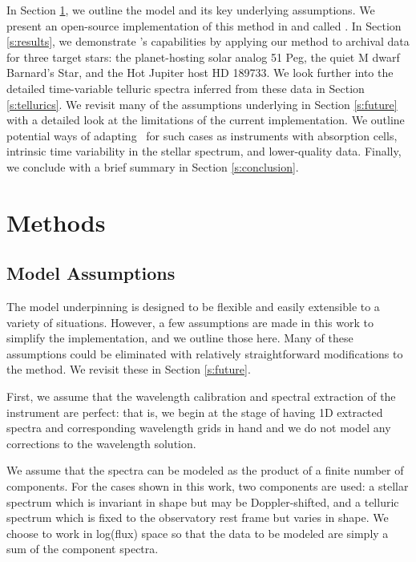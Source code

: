\documentclass[modern]{aastex62}
\newcommand{\Mdwarf}{Barnard's Star\xspace} %
\begin{document}
In Section \ref{s:methods}, we outline the model and its key underlying assumptions.
We present an open-source implementation of this method in \python and \TF called \wobble.
In Section \ref{s:results}, we demonstrate \wobble's capabilities by applying our method to \HARPS archival data for three target stars: the planet-hosting solar analog 51 Peg, the quiet M dwarf \Mdwarf, and the Hot Jupiter host HD 189733.
We look further into the detailed time-variable telluric spectra inferred from these data in Section \ref{s:tellurics}.
We revisit many of the assumptions underlying \wobble in Section \ref{s:future} with a detailed look at the limitations of the current implementation.
We outline potential ways of adapting \wobble\ for such cases as instruments with absorption cells, intrinsic time variability in the stellar spectrum, and lower-quality data.
Finally, we conclude with a brief summary in Section \ref{s:conclusion}.

\section{Methods}
\label{s:methods}
\subsection{Model Assumptions}
\label{s:assumptions}

The model underpinning \wobble is designed to be flexible and easily extensible to a variety of situations.
However, a few assumptions are made in this work to simplify the implementation, and we outline those here.
Many of these assumptions could be eliminated with relatively straightforward modifications to the method.
We revisit these in Section \ref{s:future}.

First, we assume that the wavelength calibration and spectral extraction of the instrument are perfect: that is, we begin at the stage of having 1D extracted spectra and corresponding wavelength grids in hand and we do not model any corrections to the wavelength solution.

We assume that the spectra can be modeled as the product of a finite number of components.
For the cases shown in this work, two components are used: a stellar spectrum which is invariant in shape but may be Doppler-shifted, and a telluric spectrum which is fixed to the observatory rest frame but varies in shape.
We choose to work in log(flux) space so that the data to be modeled are simply a sum of the component spectra.
\end{document}
